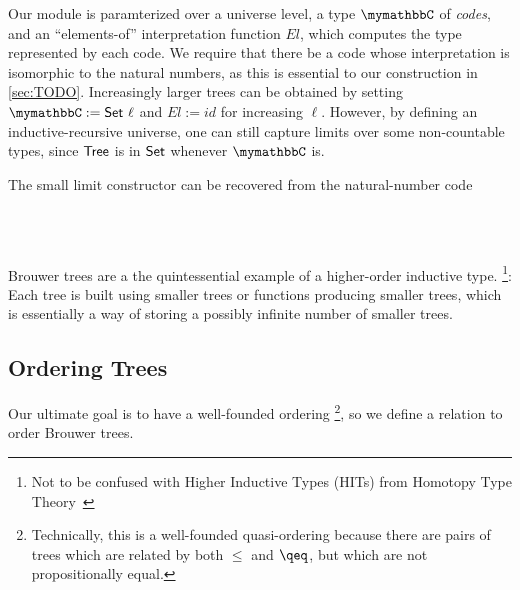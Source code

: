 Our module is paramterized over a universe level, a type $\bC$ of \textit{codes}, and an ``elements-of'' interpretation
function $\mathit{El}$, which computes the type represented by each code.
We require that there be a code whose interpretation is isomorphic to the natural numbers,
as this is essential to our construction in \cref{sec:TODO}.
Increasingly larger trees can be obtained by setting $\bC := \AgdaPrimitive{Set} \ \ell$ and
$\mathit{El} := \mathit{id}$ for increasing $\ell$.
However, by defining an inductive-recursive universe,
one can still capture limits over some non-countable types, since
 $\AgdaDatatype{Tree}$ is in $\AgdaPrimitive{Set}$ whenever $\bC$ is.

The small limit constructor can be recovered from the natural-number code
\begin{code}%
\>[0]\<%
\\
\>[0][@{}l@{\AgdaIndent{1}}]%
\>[4]\AgdaSpace{}%
\AgdaSymbol{:}\AgdaSpace{}%
\AgdaSymbol{(}\AgdaSpace{}%
\AgdaSpace{}%
\AgdaSymbol{)}\AgdaSpace{}%
\AgdaSpace{}%
\<%
\\
%
\>[4]\AgdaSpace{}%
\AgdaSpace{}%
\AgdaSymbol{=}\AgdaSpace{}%
\AgdaSpace{}%
%
\>[21]\AgdaSpace{}%
\AgdaSpace{}%
\AgdaSpace{}%
\AgdaSpace{}%
\AgdaSymbol{(}\AgdaSpace{}%
\AgdaSpace{}%
\AgdaSymbol{))}\<%
\end{code}

Brouwer trees are a the quintessential example of a higher-order inductive type.%
\footnote{Not to be confused with Higher Inductive Types (HITs) from Homotopy Type Theory~\citep{hottbook}}:
Each tree is built using smaller trees or functions producing smaller trees, which is essentially
a way of storing a possibly infinite number of smaller trees.

\subsection{Ordering Trees}

Our ultimate goal is to have a well-founded ordering%
\footnote{Technically, this is a well-founded quasi-ordering because there are pairs of
  trees which are related by both $\leq$ and $\qeq$, but which are not propositionally equal.},
so we define a relation to order Brouwer trees.

